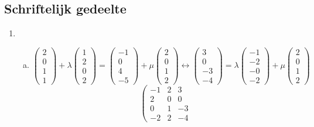 \documentclass[main.tex]{subfiles}
\begin{document}
\subsection{Schriftelijk gedeelte}
\begin{enumerate}
\item
  \begin{enumerate}[(a)]
  \item 
    \[
    \begin{pmatrix}
      2\\0\\1\\1
    \end{pmatrix}
    + \lambda
    \begin{pmatrix}
      1\\2\\0\\2
    \end{pmatrix}
    =
    \begin{pmatrix}
      -1\\0\\4\\-5
    \end{pmatrix}
    + \mu
    \begin{pmatrix}
      2\\0\\1\\2
    \end{pmatrix}
    \longleftrightarrow
    \begin{pmatrix}
      3\\0\\-3\\-4
    \end{pmatrix}
    =
    \lambda
    \begin{pmatrix}
      -1\\-2\\-0\\-2
    \end{pmatrix}
    + \mu
    \begin{pmatrix}
      2\\0\\1\\2
    \end{pmatrix}
    \]
    \[
    \left(
      \begin{array}{cc|c}
        -1 & 2 & 3\\
        2 & 0 & 0\\
        0 & 1 & -3\\
        -2 & 2 & -4
      \end{array}
\]
\end{enumerate}
\end{enumerate}
\end{document}
